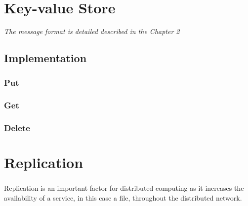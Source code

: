 \documentclass{report}
\begin{document}
				\begin{center}
				\end{center}
				
	\chapter{Key-value Store}
			\emph{The message format is detailed described in the Chapter 2}
	
	        \paragraph{}
	        
	        \paragraph{}

			\section{Implementation}
	
				\paragraph{}
				
				\paragraph{}

				\subsection{Put}
				\subsection{Get}
				\subsection{Delete}
	
	\chapter{Replication}
	
	        \paragraph{} Replication is an important factor for distributed computing
			as it increases the availability of a service, in this case a file,
			throughout the distributed network.
	        
\end{document}
